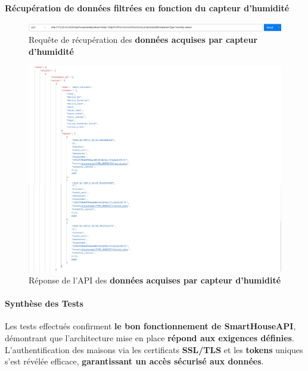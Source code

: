 \documentclass[10pt, a4paper]{report}
\begin{document}
	\vspace{1cm}
	
	\textbf{Récupération de données filtrées en fonction du capteur d'humidité}
	\begin{figure}[h!]
		\centering
		\includegraphics[width=1\textwidth]{ressources/img/preuves/dataBySensorRequete}
		\caption{Requête de récupération des \textbf{données acquises par capteur d'humidité}}
		\label{fig:dataBySensorRequete}
	\end{figure}
	
	\newpage
	
	\begin{figure}[h!]
		\centering
		\includegraphics[width=1\textwidth]{ressources/img/preuves/dataBySensorReponse}
		\caption{Réponse de l'API des \textbf{données acquises par capteur d'humidité}}
		\label{fig:dataBySensorResponse}
	\end{figure}
	
	\paragraph{Synthèse des Tests\\}
	Les tests effectués confirment \textbf{le bon fonctionnement de SmartHouseAPI}, démontrant que l’architecture mise en place\textbf{ répond aux exigences définies}. L’authentification des maisons via les certificats \textbf{SSL/TLS} et les \textbf{tokens} uniques s'est révélée efficace, \textbf{garantissant un accès sécurisé aux données}.
	
\end{document}
